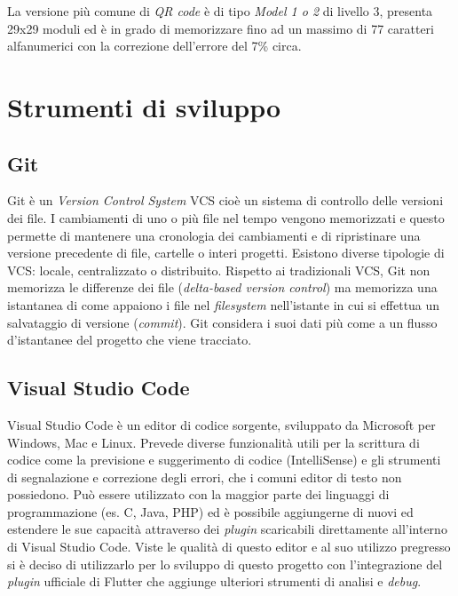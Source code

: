 La versione più comune di \textit{QR code} è di tipo \textit{Model 1 o 2} di livello 3, presenta 29x29 moduli ed è in grado di memorizzare fino ad un massimo di 77 caratteri alfanumerici con la correzione dell'errore del 7\% circa.

\section{Strumenti di sviluppo}
\subsection{Git}
Git \cite{gitSite} è un \textit{Version Control System} VCS cioè un sistema di controllo delle versioni dei file. I cambiamenti di uno o più file nel tempo vengono memorizzati e questo permette di mantenere una cronologia dei cambiamenti e di ripristinare una versione precedente di file, cartelle o interi progetti. Esistono diverse tipologie di VCS: locale, centralizzato o distribuito.
Rispetto ai tradizionali VCS, Git non memorizza le differenze dei file (\textit{delta-based version control}) ma memorizza una istantanea di come appaiono i file nel \textit{filesystem} nell'istante in cui si effettua un salvataggio di versione (\textit{commit}). Git considera i suoi dati più come a un flusso d'istantanee del progetto che viene tracciato.

\subsection{Visual Studio Code}
Visual Studio Code \cite{vsCodeSite} è un editor di codice sorgente, sviluppato da Microsoft per Windows, Mac e Linux. Prevede diverse funzionalità utili per la scrittura di codice come la previsione e suggerimento di codice (IntelliSense) e gli strumenti di segnalazione e correzione degli errori, che i comuni editor di testo non possiedono.
Può essere utilizzato con la maggior parte dei linguaggi di programmazione (es. C, Java, PHP) ed è possibile aggiungerne di nuovi ed estendere le sue capacità attraverso dei \textit{plugin} scaricabili direttamente all'interno di Visual Studio Code.
Viste le qualità di questo editor e al suo utilizzo pregresso si è deciso di utilizzarlo per lo sviluppo di questo progetto con l'integrazione del \textit{plugin} ufficiale di Flutter che aggiunge ulteriori strumenti di analisi e \textit{debug}.